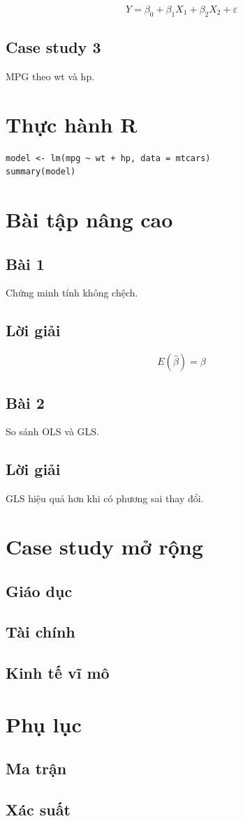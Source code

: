 \documentclass[12pt,a4paper]{book}
\begin{document}
\[
Y = \beta_0 + \beta_1 X_1 + \beta_2 X_2 + \varepsilon
\]

\section{Case study 3}
MPG theo wt và hp.

\chapter{Thực hành R}

\begin{verbatim}
model <- lm(mpg ~ wt + hp, data = mtcars)
summary(model)
\end{verbatim}

\chapter{Bài tập nâng cao}

\section{Bài 1}
Chứng minh tính không chệch.

\section{Lời giải}
\[
E(\hat{\beta}) = \beta
\]

\section{Bài 2}
So sánh OLS và GLS.

\section{Lời giải}
GLS hiệu quả hơn khi có phương sai thay đổi.

\chapter{Case study mở rộng}

\section{Giáo dục}
\section{Tài chính}
\section{Kinh tế vĩ mô}

\chapter{Phụ lục}

\section{Ma trận}
\section{Xác suất}
\end{document}
